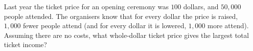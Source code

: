 Last year the ticket price for an opening ceremony was $100$ dollars, and $50{,}000$ people attended. The organisers know that for every dollar the price is raised, $1{,}000$ fewer people attend (and for every dollar it is lowered, $1{,}000$ more attend). Assuming there are no costs, what whole-dollar ticket price gives the largest total ticket income?
